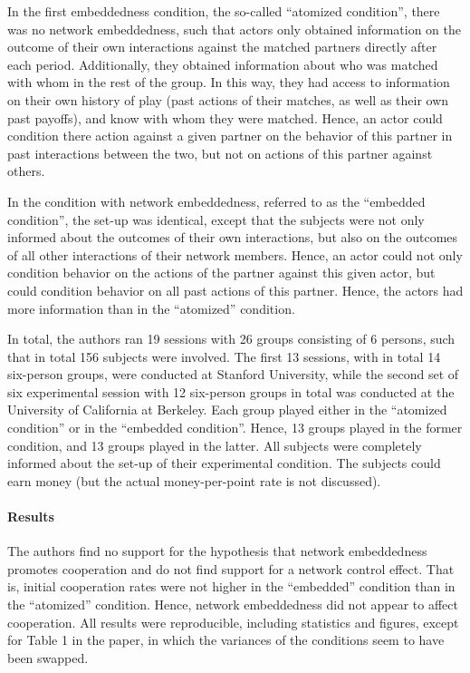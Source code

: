 \documentclass[
  11pt,
]{article}
\begin{document}
In the first embeddedness condition, the so-called ``atomized condition'', there was no network embeddedness, such that actors only obtained information on the outcome of their own interactions against the matched partners directly after each period. Additionally, they obtained information about who was matched with whom in the rest of the group. In this way, they had access to information on their own history of play (past actions of their matches, as well as their own past payoffs), and know with whom they were matched. Hence, an actor could condition there action against a given partner on the behavior of this partner in past interactions between the two, but not on actions of this partner against others.

In the condition with network embeddedness, referred to as the ``embedded condition'', the set-up was identical, except that the subjects were not only informed about the outcomes of their own interactions, but also on the outcomes of all other interactions of their network members.
Hence, an actor could not only condition behavior on the actions of the partner against this given actor, but could condition behavior on all past actions of this partner. Hence, the actors had more information than in the ``atomized'' condition.

In total, the authors ran 19 sessions with 26 groups consisting of 6 persons, such that in total 156 subjects were involved. The first 13 sessions, with in total 14 six-person groups, were conducted at Stanford University, while the second set of six experimental session with 12 six-person groups in total was conducted at the University of California at Berkeley. Each group played either in the ``atomized condition'' or in the ``embedded condition''. Hence, 13 groups played in the former condition, and 13 groups played in the latter. All subjects were completely informed about the set-up of their experimental condition. The subjects could earn money (but the actual money-per-point rate is not discussed).

\hypertarget{results-4}{%
\paragraph{Results}\label{results-4}}

The authors find no support for the hypothesis that network embeddedness promotes cooperation and do not find support for a network control effect.
That is, initial cooperation rates were not higher in the ``embedded'' condition than in the ``atomized'' condition.
Hence, network embeddedness did not appear to affect cooperation.
All results were reproducible, including statistics and figures, except for Table 1 in the paper, in which the variances of the conditions seem to have been swapped.
\end{document}
